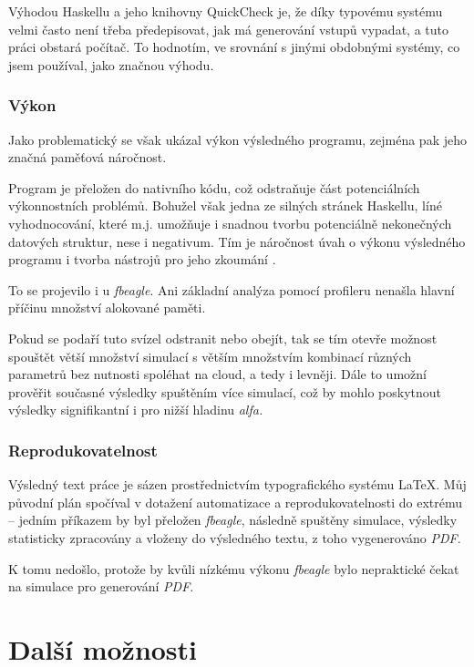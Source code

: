\begin{tcolorbox}[title={Vhodnost zvolených nástrojů pro simulaci}
                 , breakable
                 ]
Výhodou Haskellu a jeho knihovny QuickCheck \citep{Claessen:2000:QLT:351240.351266} je, že díky typovému systému velmi
často není třeba předepisovat, jak má generování vstupů vypadat, a tuto práci obstará počítač.
To hodnotím, ve srovnání s jinými obdobnými systémy, co jsem používal, jako značnou výhodu.

\subsubsection*{Výkon}

Jako problematický se však ukázal výkon výsledného programu, zejména pak jeho značná paměťová náročnost.

Program je přeložen do nativního kódu, což odstraňuje část potenciálních výkonnostních problémů. Bohužel však jedna ze silných stránek
Haskellu, líné vyhodnocování, které m.j. umožňuje i snadnou tvorbu potenciálně nekonečných datových struktur, nese i negativum.
Tím je náročnost úvah o výkonu výsledného programu i tvorba nástrojů pro jeho zkoumání \citep{wadler1998no}.

To se projevilo i u \textit{fbeagle}. Ani základní analýza pomocí profileru nenašla hlavní příčinu množství alokované paměti.

Pokud se podaří tuto svízel odstranit nebo obejít, tak se tím otevře možnost spouštět větší množství simulací s větším množstvím kombinací
různých parametrů bez nutnosti spoléhat na cloud, a tedy i levněji. Dále to umožní prověřit současné výsledky spuštěním více simulací, což by
mohlo poskytnout výsledky signifikantní i pro nižší hladinu \textit{alfa.}

\subsubsection*{Reprodukovatelnost}

Výsledný text práce je sázen prostřednictvím typografického systému \LaTeX. Můj původní plán spočíval v dotažení
automatizace a reprodukovatelnosti do extrému -- jedním příkazem by byl přeložen \textit{fbeagle}, následně
spuštěny simulace, výsledky statisticky zpracovány a vloženy do výsledného textu, z toho vygenerováno \textit{PDF}.

K tomu nedošlo, protože by kvůli nízkému výkonu \textit{fbeagle} bylo nepraktické čekat na simulace pro generování
\textit{PDF}.

\end{tcolorbox}

\section{Další možnosti}

